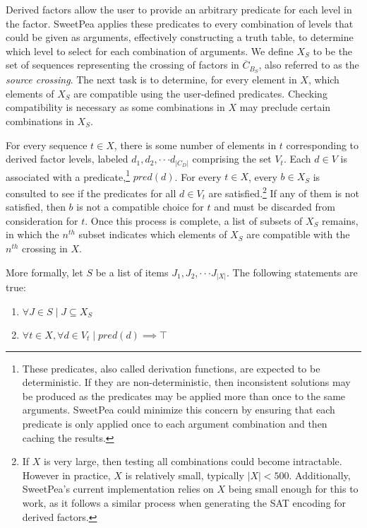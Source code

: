 Derived factors allow the user to provide an arbitrary predicate for each level in the factor. SweetPea applies these predicates to every combination of levels that could be given as arguments, effectively constructing a truth table, to determine which level to select for each combination of arguments. We define $X_S$ to be the set of sequences representing the crossing of factors in $\overline{C}_{B_S}$, also referred to as the \textit{source crossing}. The next task is to determine, for every element in $X$, which elements of $X_S$ are compatible using the user-defined predicates. Checking compatibility is necessary as some combinations in $X$ may preclude certain combinations in $X_S$.

For every sequence $t \in X$, there is some number of elements in $t$ corresponding to derived factor levels, labeled $d_1, d_2, \cdot\cdot\cdot d_{|C_D|}$ comprising the set $V_t$. Each $d \in V$ is associated with a predicate,\footnote{These predicates, also called derivation functions, are expected to be deterministic. If they are non-deterministic, then inconsistent solutions may be produced as the predicates may be applied more than once to the same arguments. SweetPea could minimize this concern by ensuring that each predicate is only applied once to each argument combination and then caching the results.} $pred(d)$. For every $t \in X$, every $b \in X_S$ is consulted to see if the predicates for all $d \in V_t$ are satisfied.\footnote{If $X$ is very large, then testing all combinations could become intractable. However in practice, $X$ is relatively small, typically $|X| < 500$. Additionally, SweetPea's current implementation relies on $X$ being small enough for this to work, as it follows a similar process when generating the SAT encoding for derived factors.} If any of them is not satisfied, then $b$ is not a compatible choice for $t$ and must be discarded from consideration for $t$. Once this process is complete, a list of subsets of $X_S$ remains, in which the $n^{th}$ subset indicates which elements of $X_S$ are compatible with the $n^{th}$ crossing in $X$.

More formally, let $S$ be a list of items $J_1, J_2, \cdot\cdot\cdot J_{|X|}$. The following statements are true:

\begin{enumerate}
\item $\forall J \in S \mid J \subseteq X_S$
\item $\forall t \in X,  \forall d \in V_t \mid pred(d) \implies \top$
\end{enumerate}

